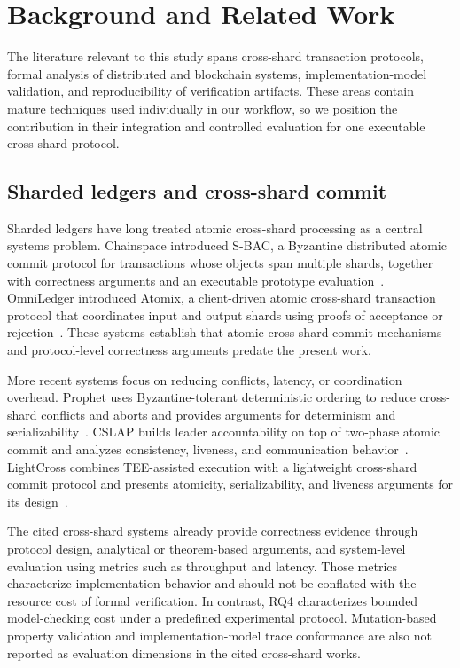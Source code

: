 \section{Background and Related Work}
\label{sec:background-related-work}

The literature relevant to this study spans cross-shard transaction protocols,
formal analysis of distributed and blockchain systems, implementation-model
validation, and reproducibility of verification artifacts. These areas contain
mature techniques used individually in our workflow, so we position the
contribution in their integration and controlled evaluation for one executable
cross-shard protocol.

\subsection{Sharded ledgers and cross-shard commit}
\label{subsec:related-cross-shard}

Sharded ledgers have long treated atomic cross-shard processing as a central
systems problem. Chainspace introduced S-BAC, a Byzantine distributed atomic
commit protocol for transactions whose objects span multiple shards, together
with correctness arguments and an executable prototype
evaluation~\cite{albassam2018chainspace}. OmniLedger introduced Atomix, a
client-driven atomic cross-shard transaction protocol that coordinates input
and output shards using proofs of acceptance or
rejection~\cite{kokoriskogias2018omniledger}. These systems establish that
atomic cross-shard commit mechanisms and protocol-level correctness arguments
predate the present work.

More recent systems focus on reducing conflicts, latency, or coordination
overhead. Prophet uses Byzantine-tolerant deterministic ordering to reduce
cross-shard conflicts and aborts and provides arguments for determinism and
serializability~\cite{hong2023prophet}. CSLAP builds leader accountability on
top of two-phase atomic commit and analyzes consistency, liveness, and
communication behavior~\cite{du2024cslap}. LightCross combines TEE-assisted
execution with a lightweight cross-shard commit protocol and presents
atomicity, serializability, and liveness arguments for its
design~\cite{qi2024lightcross}.

The cited cross-shard systems already provide correctness evidence through
protocol design, analytical or theorem-based arguments, and system-level
evaluation using metrics such as throughput and latency. Those metrics
characterize implementation behavior and should not be conflated with the
resource cost of formal verification. In contrast, RQ4 characterizes bounded
model-checking cost under a predefined experimental protocol. Mutation-based
property validation and implementation-model trace conformance are also not
reported as evaluation dimensions in the cited cross-shard works.

